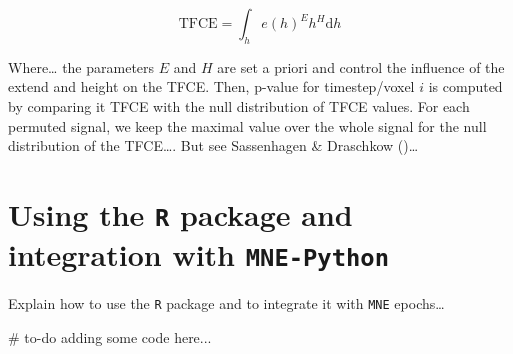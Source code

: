 \documentclass[
  doc,
  floatsintext,
  longtable,
  a4paper,
  nolmodern,
  notxfonts,
  notimes,
  colorlinks=true,linkcolor=blue,citecolor=blue,urlcolor=blue]{apa7}
\newenvironment{Shaded}{\begin{snugshade}}{\end{snugshade}}
\newcommand{\CommentTok}[1]{\textcolor[rgb]{0.37,0.37,0.37}{#1}}
\begin{document}
\[
\text{TFCE} = \int_{h} e(h)^{E} h^{H} \mathrm{d}h
\]

Where\ldots{} the parameters \(E\) and \(H\) are set a priori and
control the influence of the extend and height on the TFCE. Then,
p-value for timestep/voxel \(i\) is computed by comparing it TFCE with
the null distribution of TFCE values. For each permuted signal, we keep
the maximal value over the whole signal for the null distribution of the
TFCE\ldots. But see Sassenhagen \& Draschkow
()\ldots{}

\newpage

\section{\texorpdfstring{Using the \texttt{R} package and integration
with
\texttt{MNE-Python}}{Using the R package and integration with MNE-Python}}\label{using-the-r-package-and-integration-with-mne-python}

Explain how to use the \texttt{R} package and to integrate it with
\texttt{MNE} epochs\ldots{}

\begin{Shaded}
\begin{Highlighting}[]
\CommentTok{\# to{-}do adding some code here...}
\end{Highlighting}
\end{Shaded}
\end{document}
